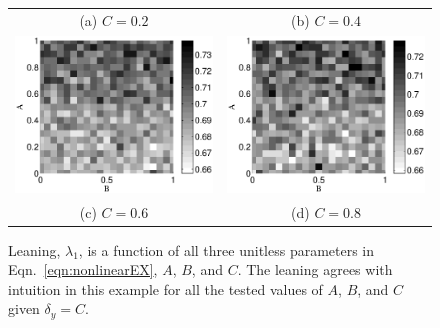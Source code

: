 \documentclass[a4paper,11pt,twocolumn]{article}
\begin{document}
\begin{figure}[ht]
\begin{tabular}{cc}
(a) $C=0.2$ & (b) $C=0.4$ \\
\includegraphics[scale=0.30]{NonlinearCyclicexample_BxytolC06.eps} &
\includegraphics[scale=0.30]{NonlinearCyclicexample_BxytolC08.eps} \\
(c) $C=0.6$ & (d) $C=0.8$ \\
\end{tabular}
\caption{Leaning, $\lambda_1$, is a function of all three unitless parameters in Eqn.\ \ref{eqn:nonlinearEX}, $A$, $B$, and $C$.  The leaning agrees with intuition in this example for all the tested values of $A$, $B$, and $C$ given $\delta_y=C$.}
\label{fig:nonlin1}
\end{figure}
\end{document}
